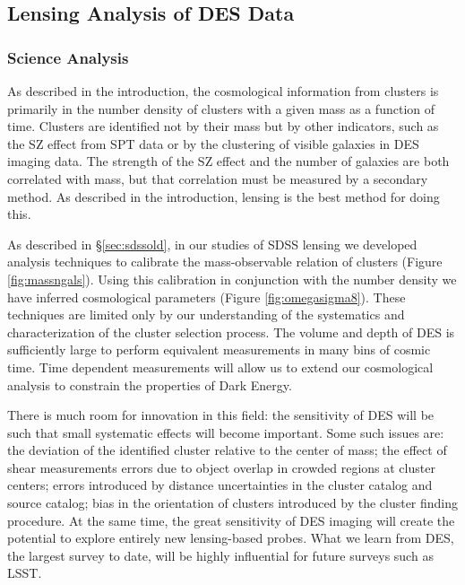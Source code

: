 \documentclass[12pt]{article}
\begin{document}
\subsection{Lensing Analysis of DES Data} \label{sec:deslensing}

\subsubsection{Science Analysis}

As described in the introduction, the cosmological information from clusters is
primarily in the number density of clusters with a given mass as a function of
time.  Clusters are identified not by their mass but by other indicators, such
as the SZ effect from SPT data or by the clustering of visible galaxies in DES
imaging data.  The strength of the SZ effect and the number of galaxies are
both correlated with mass, but that correlation must be measured by a secondary
method.  As described in the introduction, lensing is the best method for doing
this.  

As described in \S\ref{sec:sdssold}, in our studies of SDSS lensing we
developed analysis techniques to calibrate the mass-observable relation of
clusters (Figure \ref{fig:massngals}).  Using this calibration in conjunction
with the number density we have inferred cosmological parameters (Figure
\ref{fig:omegasigma8}).  These techniques are limited only by our understanding
of the systematics and characterization of the cluster selection process.  The
volume and depth of DES is sufficiently large to perform equivalent
measurements in many bins of cosmic time.  Time dependent measurements will
allow us to extend our cosmological analysis to constrain the properties of
Dark Energy.

There is much room for innovation in this field: the sensitivity of DES will be
such that small systematic effects will become important. Some such issues are:
the deviation of the identified cluster relative to the center of mass; the
effect of shear measurements errors due to object overlap in crowded regions at
cluster centers; errors introduced by distance uncertainties in the cluster
catalog and source catalog; bias in the orientation of clusters introduced by
the cluster finding procedure.  At the same time, the great sensitivity of DES
imaging will create the potential to explore entirely new lensing-based probes.
What we learn from DES, the largest survey to date, will be highly influential
for future surveys such as LSST.
\end{document}
